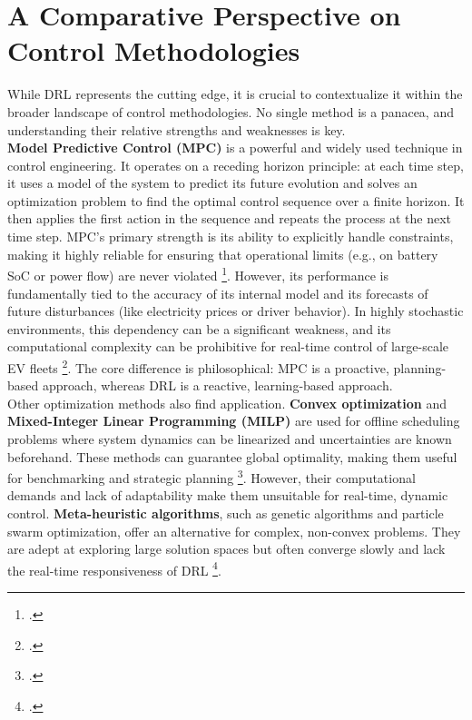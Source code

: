 \section{A Comparative Perspective on Control Methodologies}
While DRL represents the cutting edge, it is crucial to contextualize it within the broader landscape of control methodologies. No single method is a panacea, and understanding their relative strengths and weaknesses is key.
\\
\textbf{Model Predictive Control (MPC)} is a powerful and widely used technique in control engineering. It operates on a receding horizon principle: at each time step, it uses a model of the system to predict its future evolution and solves an optimization problem to find the optimal control sequence over a finite horizon. It then applies the first action in the sequence and repeats the process at the next time step. MPC's primary strength is its ability to explicitly handle constraints, making it highly reliable for ensuring that operational limits (e.g., on battery SoC or power flow) are never violated \footcite{alsabbagh2022reinforcement, di2016lagrangian}. However, its performance is fundamentally tied to the accuracy of its internal model and its forecasts of future disturbances (like electricity prices or driver behavior). In highly stochastic environments, this dependency can be a significant weakness, and its computational complexity can be prohibitive for real-time control of large-scale EV fleets \footcite{faggio2023design}. The core difference is philosophical: MPC is a proactive, planning-based approach, whereas DRL is a reactive, learning-based approach.
\\
Other optimization methods also find application. \textbf{Convex optimization} and \textbf{Mixed-Integer Linear Programming (MILP)} are used for offline scheduling problems where system dynamics can be linearized and uncertainties are known beforehand. These methods can guarantee global optimality, making them useful for benchmarking and strategic planning \footcite{faggio2023design, salvatti2020electric}. However, their computational demands and lack of adaptability make them unsuitable for real-time, dynamic control. \textbf{Meta-heuristic algorithms}, such as genetic algorithms and particle swarm optimization, offer an alternative for complex, non-convex problems. They are adept at exploring large solution spaces but often converge slowly and lack the real-time responsiveness of DRL \footcite{ghosh2024optimal, kumar2024integration}.
\\
